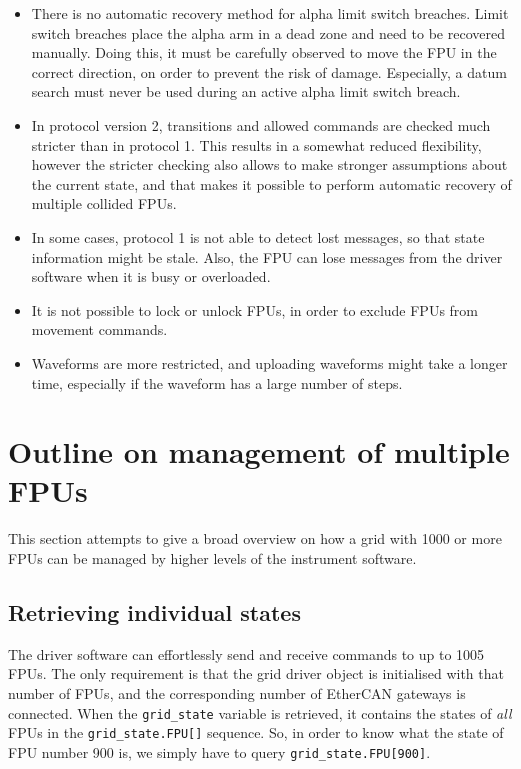 \documentclass[11pt,a4paper]{scrartcl}
\begin{document}
\begin{itemize}
\item There is no automatic recovery method for alpha limit switch
  breaches. Limit switch breaches place the alpha arm in a dead zone
  and need to be recovered manually. Doing this, it must be carefully
  observed to move the FPU in the correct direction, on order to
  prevent the risk of damage. Especially, a datum search must never be
  used during an active alpha limit switch breach.

\item In protocol version 2, transitions and allowed commands are
  checked much stricter than in protocol 1.  This results in a
  somewhat reduced flexibility, however the stricter checking also
  allows to make stronger assumptions about the current state, and
  that makes it possible to perform automatic recovery of multiple
  collided FPUs.
  
\item In some cases, protocol 1 is not able to detect lost messages,
  so that state information might be stale. Also, the FPU can lose
  messages from the driver software when it is busy or overloaded. 
  

\item It is not possible to lock or unlock FPUs, in order to exclude
  FPUs from movement commands.
  
\item Waveforms are more restricted, and uploading waveforms might
  take a longer time, especially if the waveform has a large number of
  steps.
  
\end{itemize}

\section{Outline on management of multiple FPUs}
\label{sec:multifpu}
This section attempts to give a broad overview on how a grid with 1000
or more FPUs can be managed by higher levels of the instrument
software.

\subsection{Retrieving individual states}
The driver software can effortlessly send and receive commands to up
to 1005 FPUs. The only requirement is that the grid driver object is
initialised with that number of FPUs, and the corresponding number of
EtherCAN gateways is connected. When the \texttt{grid\_state} variable
is retrieved, it contains the states of \emph{all} FPUs in the
\verb+grid_state.FPU[]+ sequence. So, in order to know what the state
of FPU number 900 is, we simply have to query
\verb+grid_state.FPU[900]+.
\end{document}
